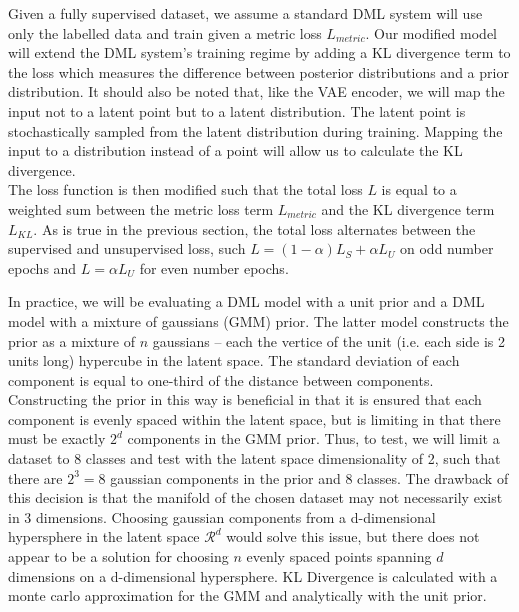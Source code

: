 \documentclass[./dissertation.tex]{subfiles}
\begin{document}
    Given a fully supervised dataset, we assume a standard DML system will use only the labelled data and train given a metric loss $L_{metric}$. Our modified model will extend the DML system's training regime by adding a KL divergence term to the loss which measures the difference between posterior distributions and a prior distribution. It should also be noted that, like the VAE encoder, we will map the input not to a latent point but to a latent distribution. The latent point is stochastically sampled from the latent distribution during training. Mapping the input to a distribution instead of a point will allow us to calculate the KL divergence. \\
    
    The loss function is then modified such that the total loss $L$ is equal to a weighted sum between the metric loss term $L_{metric}$ and the KL divergence term $L_{KL}$. As is true in the previous section, the total loss alternates between the supervised and unsupervised loss, such $L = (1 - \alpha) L_{S} + \alpha L_{U}$ on odd number epochs and $L = \alpha L_{U}$ for even number epochs.
    
    In practice, we will be evaluating a DML model with a unit prior and a DML model with a mixture of gaussians (GMM) prior. The latter model constructs the prior as a mixture of $n$ gaussians -- each the vertice of the unit (i.e. each side is 2 units long) hypercube in the latent space. The standard deviation of each component is equal to one-third of the distance between components. Constructing the prior in this way is beneficial in that it is ensured that each component is evenly spaced within the latent space, but is limiting in that there must be exactly $2^{d}$ components in the GMM prior. Thus, to test, we will limit a dataset to 8 classes and test with the latent space dimensionality of 2, such that there are $2^{3}=8$ gaussian components in the prior and 8 classes. The drawback of this decision is that the manifold of the chosen dataset may not necessarily exist in 3 dimensions. Choosing gaussian components from a d-dimensional hypersphere in the latent space $\mathcal{R}^{d}$ would solve this issue, but there does not appear to be a solution for choosing $n$ evenly spaced points spanning $d$ dimensions on a d-dimensional hypersphere. KL Divergence is calculated with a monte carlo approximation for the GMM and analytically with the unit prior.
    
\end{document}
